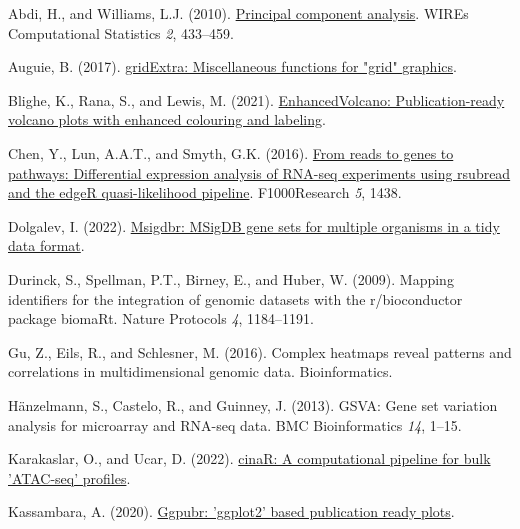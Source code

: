 \documentclass[
  parskip,
  oneside]{scrreprt}
\newlength{\cslhangindent}
\newlength{\cslentryspacingunit} %
\newenvironment{CSLReferences}[2] %
 {%
  \setlength{\parindent}{0pt}
  \ifodd #1
  \let\oldpar\par
  \def\par{\hangindent=\cslhangindent\oldpar}
  \fi
  \setlength{\parskip}{#2\cslentryspacingunit}
 }%
 {}
\begin{document}
\hypertarget{refs}{}
\begin{CSLReferences}{0}{0}
\leavevmode{}%
Abdi, H., and Williams, L.J. (2010).
\href{https://doi.org/10.1002/wics.101}{Principal component analysis}.
WIREs Computational Statistics \emph{2}, 433--459.

\leavevmode{}%
Auguie, B. (2017).
\href{https://CRAN.R-project.org/package=gridExtra}{gridExtra:
Miscellaneous functions for "grid" graphics}.

\leavevmode{}%
Blighe, K., Rana, S., and Lewis, M. (2021).
\href{https://github.com/kevinblighe/EnhancedVolcano}{EnhancedVolcano:
Publication-ready volcano plots with enhanced colouring and labeling}.

\leavevmode{}%
Chen, Y., Lun, A.A.T., and Smyth, G.K. (2016).
\href{https://doi.org/10.12688/f1000research.8987.2}{From reads to genes
to pathways: Differential expression analysis of RNA-seq experiments
using rsubread and the edgeR quasi-likelihood pipeline}. F1000Research
\emph{5}, 1438.

\leavevmode{}%
Dolgalev, I. (2022).
\href{https://CRAN.R-project.org/package=msigdbr}{Msigdbr: MSigDB gene
sets for multiple organisms in a tidy data format}.

\leavevmode{}%
Durinck, S., Spellman, P.T., Birney, E., and Huber, W. (2009). Mapping
identifiers for the integration of genomic datasets with the
r/bioconductor package biomaRt. Nature Protocols \emph{4}, 1184--1191.

\leavevmode{}%
Gu, Z., Eils, R., and Schlesner, M. (2016). Complex heatmaps reveal
patterns and correlations in multidimensional genomic data.
Bioinformatics.

\leavevmode{}%
Hänzelmann, S., Castelo, R., and Guinney, J. (2013). GSVA: Gene set
variation analysis for microarray and RNA-seq data. BMC Bioinformatics
\emph{14}, 1--15.

\leavevmode{}%
Karakaslar, O., and Ucar, D. (2022).
\href{https://CRAN.R-project.org/package=cinaR}{cinaR: A computational
pipeline for bulk 'ATAC-seq' profiles}.

\leavevmode{}%
Kassambara, A. (2020).
\href{https://CRAN.R-project.org/package=ggpubr}{Ggpubr: 'ggplot2' based
publication ready plots}.


\end{CSLReferences}
\end{document}
